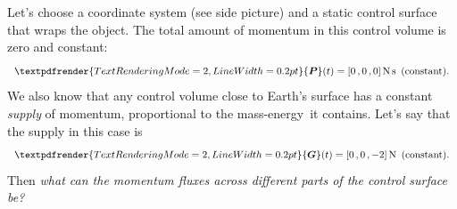\documentclass[a4paper,12pt,%
onecolumn,oneside,%
british%
]{memoir}
\renewcommand*{\bm}[1]{\textpdfrender{TextRenderingMode=2,LineWidth=0.2pt}{\boldsymbol{#1}}}
\renewcommand*{\|}[1][]{\nonscript\:#1\vert\nonscript\:\mathopen{}}
\newcommand*{\sect}{\S}%
\renewcommand*{\autoref}[3][\sect\,\ref]{\textcolor{blue}{#3} {\color{blue}\scriptsize(\faIcon[regular]{eye}\;#1{#2}\;p.\,\pageref{#2})}}
\newcommand*{\masse}{mass-energy}
\newcommand*{\yP}{\bm{P}}
\newcommand*{\yG}{\bm{G}}
\begin{document}
Let's choose a coordinate system (see side picture) and a static control surface that wraps the object. The total amount of momentum in this control volume is zero and constant:
%
%
\begin{equation*}
  \yP(t) = [0\,,0\,,0]\,\unit{N\,s}\enskip\text{(constant)}.
\end{equation*}
We also know that any control volume close to Earth's surface %
has a constant \emph{supply} of momentum, proportional to the \masse\ it contains. Let's say that the supply in this case is
\begin{equation*}
  \yG(t) = [0\,,0\,,\num{-2}]\,\unit{N}\enskip\text{(constant)}.
\end{equation*}
Then \emph{what can the momentum fluxes across different parts of the control surface be?}
\end{document}
